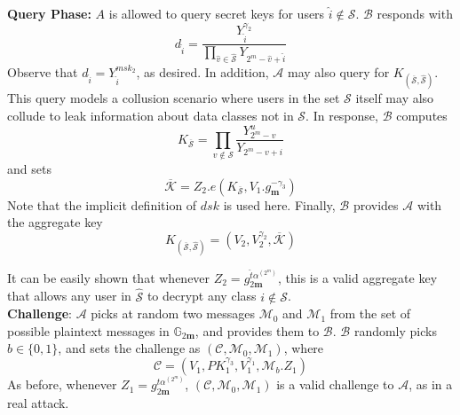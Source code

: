 \noindent\textbf{Query Phase:} $A$ is allowed to query secret keys for users $\hat{i}\notin\mathcal{S}$. $\mathcal{B}$ responds with 
\begin{equation}
 d_{\hat{i}} = \frac{Y^{\gamma_2}_{\hat{i}}}{\prod_{\hat{v}\in\hat{\mathcal{S}}}Y_{2^m-\hat{v}+\hat{i}}}\nonumber
\end{equation}
\noindent Observe that $d_{\hat{i}}=Y^{msk_2}_{\hat{i}}$, as desired. In addition, $\mathcal{A}$ may also query for $K_{\left(\overline{\mathcal{S}},\hat{\mathcal{S}}\right)}$. This query models a collusion scenario where users in the set $\mathcal{S}$ itself may also collude to leak information about data classes not in $\mathcal{S}$. In response, $\mathcal{B}$ computes   
\begin{equation}
 K_{\overline{\mathcal{S}}} = \prod_{v\notin\mathcal{S}}\frac{Y^{u}_{2^m-v}}{Y_{2^m-v+i}}\nonumber
\end{equation}
\noindent and sets
\begin{equation}
 \overline{\mathcal{K}} = Z_2.e(K_{\overline{\mathcal{S}}},V_1.g^{-\gamma_3}_{\mathbf{m}})\nonumber
\end{equation}
\noindent Note that the implicit definition of $dsk$ is used here. Finally, $\mathcal{B}$ provides $\mathcal{A}$ with the aggregate key 
\begin{equation} 
 K_{\left(\overline{\mathcal{S}},\hat{\mathcal{S}}\right)}=\left(V_2,V^{\gamma_2}_2,\overline{\mathcal{K}}\right)\nonumber
\end{equation}

\noindent It can be easily shown that whenever $Z_2=g^{\hat{t}\alpha^{(2^m)}}_{2\mathbf{m}}$, this is a valid aggregate key that allows any user in $\hat{\mathcal{S}}$ to decrypt any class $i\notin\mathcal{S}$.\\

\noindent \textbf{Challenge}: $\mathcal{A}$ picks at random two messages $\mathcal{M}_0$ and $\mathcal{M}_1$ from the set of possible plaintext messages in $\mathbb{G}_{2\mathbf{m}}$, and provides them to $\mathcal{B}$. $\mathcal{B}$ randomly picks $b\in\{0,1\}$, and sets the challenge as $(\mathcal{C},\mathcal{M}_0,\mathcal{M}_1)$, where 
\begin{equation}
 \mathcal{C}=(V_1,PK^{\gamma_3}_1,V^{\gamma_1}_1,\mathcal{M}_b.Z_1) \nonumber
\end{equation}
\noindent As before, whenever $Z_1=g^{t\alpha^{(2^m)}}_{2\mathbf{m}}$, $(\mathcal{C},\mathcal{M}_0,\mathcal{M}_1)$ is a valid challenge to $\mathcal{A}$, as in a real attack. \\


